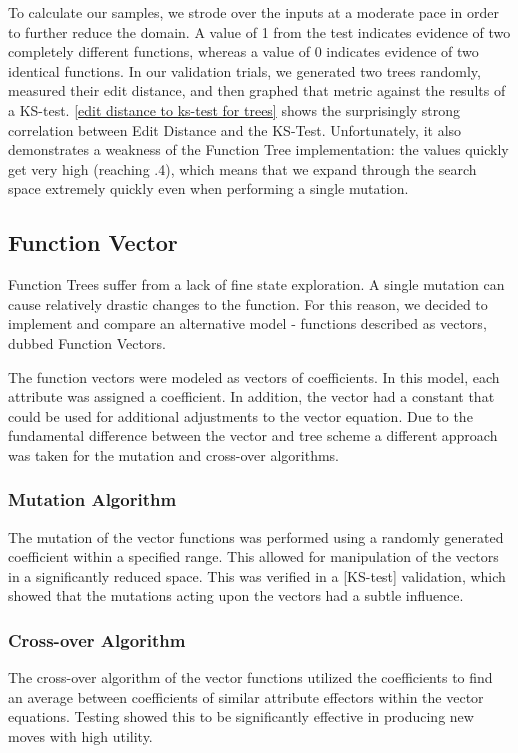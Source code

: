 \documentclass{acm_proc_article-sp}
\begin{document}
To calculate our samples, we strode over the inputs at a moderate pace in order to further reduce the domain. A value of 1 from the test indicates evidence of two completely different functions, whereas a value of 0 indicates evidence of two identical functions.
In our validation trials, we generated two trees randomly, measured their edit distance, and then graphed that metric against the results of a KS-test. \ref{edit distance to ks-test for trees} shows the surprisingly strong correlation between Edit Distance and the KS-Test. Unfortunately, it also demonstrates a weakness of the Function Tree implementation: the values quickly get very high (reaching .4), which means that we expand through the search space extremely quickly even when performing a single mutation.

	\subsection{Function Vector}
    
Function Trees suffer from a lack of fine state exploration. A single mutation can cause relatively drastic changes to the function. For this reason, we decided to implement and compare an alternative model - functions described as vectors, dubbed Function Vectors.

The function vectors were modeled as vectors of coefficients. In this model, each attribute was assigned a coefficient. In addition, the vector had a constant that could be used for additional adjustments to the vector equation. Due to the fundamental difference between the vector and tree scheme a different approach was taken for the mutation and cross-over algorithms. 
    
    \subsubsection{Mutation Algorithm}
    The mutation of the vector functions was performed using a randomly generated coefficient within a specified range. This allowed for manipulation of the vectors in a significantly reduced space. This was verified in a [KS-test] validation, which showed that the mutations acting upon the vectors had a subtle influence.
    
    \subsubsection{Cross-over Algorithm}
    The cross-over algorithm of the vector functions utilized the coefficients to find an average between coefficients of similar attribute effectors within the vector equations. Testing showed this to be significantly effective in producing new moves with high utility.
    
\end{document}
